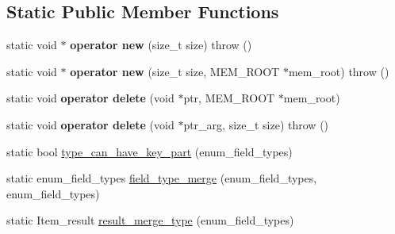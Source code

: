 \subsection*{Static Public Member Functions}
\begin{DoxyCompactItemize}
\item 
\mbox{\label{classField_ab735db219e1a18158bfdb181b13fb143}} 
static void $\ast$ {\bfseries operator new} (size\+\_\+t size)  throw ()
\item 
\mbox{\label{classField_af14e0e06528c0d0c2c6738cc54854f9d}} 
static void $\ast$ {\bfseries operator new} (size\+\_\+t size, M\+E\+M\+\_\+\+R\+O\+OT $\ast$mem\+\_\+root)  throw ()
\item 
\mbox{\label{classField_aa59d28d6678bd552d928282e1a6d0025}} 
static void {\bfseries operator delete} (void $\ast$ptr, M\+E\+M\+\_\+\+R\+O\+OT $\ast$mem\+\_\+root)
\item 
\mbox{\label{classField_a11c29b52c2500d0ec9a4523c74100b84}} 
static void {\bfseries operator delete} (void $\ast$ptr\+\_\+arg, size\+\_\+t size)  throw ()
\item 
static bool \mbox{\hyperlink{classField_a9119fec4aa570a98879146f00b48c90d}{type\+\_\+can\+\_\+have\+\_\+key\+\_\+part}} (enum\+\_\+field\+\_\+types)
\item 
static enum\+\_\+field\+\_\+types \mbox{\hyperlink{classField_ab20100743e6462945e5c0a5130a9ab9d}{field\+\_\+type\+\_\+merge}} (enum\+\_\+field\+\_\+types, enum\+\_\+field\+\_\+types)
\item 
static Item\+\_\+result \mbox{\hyperlink{classField_aa68d124a26fb9eba0545155219d9327e}{result\+\_\+merge\+\_\+type}} (enum\+\_\+field\+\_\+types)
\end{DoxyCompactItemize}
